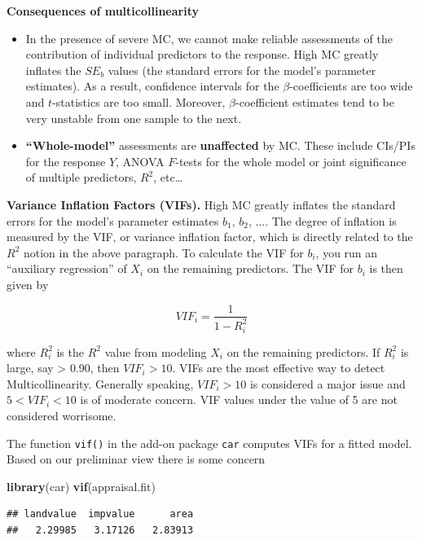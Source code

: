 \documentclass[
]{book}
\newenvironment{Shaded}{\begin{snugshade}}{\end{snugshade}}
\newcommand{\FunctionTok}[1]{\textcolor[rgb]{0.13,0.29,0.53}{\textbf{#1}}}
\newcommand{\NormalTok}[1]{#1}
\providecommand{\tightlist}{%
  \setlength{\itemsep}{0pt}\setlength{\parskip}{0pt}}
\begin{document}
\textbf{Consequences of multicollinearity}

\begin{itemize}
\tightlist
\item
  In the presence of severe MC, we cannot make reliable assessments of the contribution of individual predictors to the response. High MC greatly inflates the \(SE_b\) values (the standard errors for the model's parameter estimates). As a result, confidence intervals for the \(\beta\)-coefficients are too wide and \(t\)-statistics are too small. Moreover, \(\beta\)-coefficient estimates tend to be very unstable from one sample to the next.
\item
  \textbf{``Whole-model''} assessments are \textbf{unaffected} by MC. These include CIs/PIs for the response \(Y\), ANOVA \(F\)-tests for the whole model or joint significance of multiple predictors, \(R^2\), etc\ldots{}
\end{itemize}

\textbf{Variance Inflation Factors (VIFs).} High MC greatly inflates the standard errors for the model's parameter estimates \(b_1\), \(b_2\), \(\ldots\). The degree of inflation is measured by the VIF, or variance inflation factor, which is directly related to the \(R^2\) notion in the above paragraph. To calculate the VIF for \(b_i\), you run an ``auxiliary regression'' of \(X_i\) on the remaining predictors. The VIF for \(b_i\) is then given by

\[VIF_i = \frac{1}{1-R^2_i}\]

where \(R_i^2\) is the \(R^2\) value from modeling \(X_i\) on the remaining predictors. If \(R_i^2\) is large, say \textgreater{} 0.90, then \(VIF_i > 10\). VIFs are the most effective way to detect Multicollinearity. Generally speaking, \(VIF_i > 10\) is considered a major issue and \(5 < VIF_i < 10\) is of moderate concern. VIF values under the value of 5 are not considered worrisome.

The function \texttt{vif()} in the add-on package \texttt{car} computes VIFs for a fitted model. Based on our preliminar view there is some concern

\begin{Shaded}
\begin{Highlighting}[]
\FunctionTok{library}\NormalTok{(car)}
\FunctionTok{vif}\NormalTok{(appraisal.fit)}
\end{Highlighting}
\end{Shaded}

\begin{verbatim}
## landvalue  impvalue      area 
##   2.29985   3.17126   2.83913
\end{verbatim}
\end{document}
